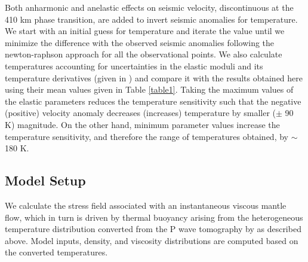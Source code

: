 \documentclass[draft,linenumbers]{agujournal2018}
\begin{document}
Both anharmonic and anelastic effects on seismic velocity, discontinuous at the 410 km phase transition, are added to invert seismic anomalies for temperature. We start with an initial guess for temperature and iterate the value until we minimize the difference with the observed seismic anomalies following the newton-raphson approach for all the observational points. We also calculate temperatures accounting for uncertainties in the elastic moduli and its temperature derivatives (given in \citet{Cammarano2003}) and compare it with the results obtained here using their mean values given in Table \ref{table1}. Taking the maximum values of the elastic parameters reduces the temperature sensitivity such that the negative (positive) velocity anomaly decreases (increases) temperature by smaller ($\pm$ 90 K) magnitude. On the other hand, minimum parameter values increase the temperature sensitivity, and therefore the range of temperatures obtained, by $\sim$ 180 K. 

\subsection{Model Setup}
    We calculate the stress field associated with an instantaneous viscous mantle flow, which in turn is driven by thermal buoyancy arising from the heterogeneous temperature distribution converted from the P wave tomography by \citet{Biryol_2016} as described above. Model inputs, density, and viscosity distributions are computed based on the converted temperatures. 
    
\end{document}
